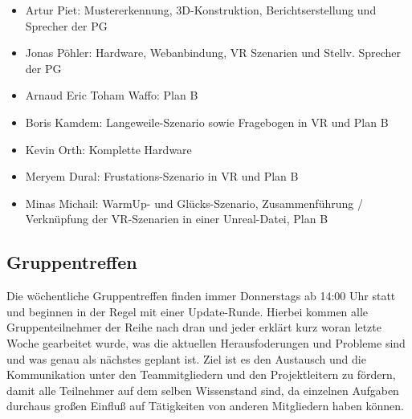 \begin{itemize} \setlength\itemsep{-0.15cm}
  \item Artur Piet: Mustererkennung, 3D-Konstruktion, Berichtserstellung und Sprecher der PG
  \item Jonas P{\"o}hler: Hardware, Webanbindung, VR Szenarien und Stellv. Sprecher der PG
  \item Arnaud Eric Toham Waffo: Plan B
  \item Boris Kamdem: Langeweile-Szenario sowie Fragebogen in VR und Plan B
  \item Kevin Orth: Komplette Hardware
  \item Meryem Dural: Frustations-Szenario in VR und Plan B
  \item Minas Michail: WarmUp- und Gl{\"u}cks-Szenario, Zusammenführung / Verknüpfung der VR-Szenarien in einer Unreal-Datei, Plan B
\end{itemize}




\subsection{Gruppentreffen}


Die w{\"o}chentliche Gruppentreffen finden immer Donnerstags ab 14:00 Uhr statt und beginnen in der Regel mit einer Update-Runde. Hierbei kommen alle Gruppenteilnehmer der Reihe nach dran und jeder erkl{\"a}rt kurz woran letzte Woche gearbeitet wurde, was die aktuellen Herausfoderungen und Probleme sind und was genau als n{\"a}chstes geplant ist. Ziel ist es den Austausch und die Kommunikation unter den Teammitgliedern und den Projektleitern zu f{\"o}rdern, damit alle Teilnehmer auf dem selben Wissenstand sind, da einzelnen Aufgaben durchaus gro{\ss}en Einflu{\ss} auf T{\"a}tigkeiten von anderen Mitgliedern haben k{\"o}nnen. \\